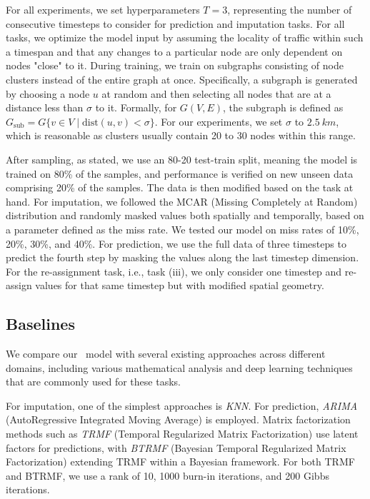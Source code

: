 For all experiments, we set hyperparameters \(T = 3\), representing the number of consecutive timesteps to consider for prediction and imputation tasks. For all tasks, we optimize the model input by assuming the locality of traffic within such a timespan and that any changes to a particular node are only dependent on nodes "close" to it. During training, we train on subgraphs consisting of node clusters instead of the entire graph at once. Specifically, a subgraph is generated by choosing a node \(u\) at random and then selecting all nodes that are at a distance less than \(\sigma\) to it. Formally, for \(G(V, E)\), the subgraph is defined as \(G_{\text{sub}} = G\{v \in V \mid \text{dist}(u, v) < \sigma\}\). For our experiments, we set \(\sigma\) to \(2.5\ km\), which is reasonable as clusters usually contain 20 to 30 nodes within this range.

After sampling, as stated, we use an 80-20 test-train split, meaning the model is trained on 80\% of the samples, and performance is verified on new unseen data comprising 20\% of the samples. The data is then modified based on the task at hand. For imputation, we followed the MCAR (Missing Completely at Random) distribution and randomly masked values both spatially and temporally, based on a parameter defined as the miss rate. We tested our model on miss rates of 10\%, 20\%, 30\%, and 40\%. For prediction, we use the full data of three timesteps to predict the fourth step by masking the values along the last timestep dimension. For the re-assignment task, i.e., task (iii), we only consider one timestep and re-assign values for that same timestep but with modified spatial geometry.

\subsection{Baselines}

We compare our \name\ model with several existing approaches across different domains, including various mathematical analysis and deep learning techniques that are commonly used for these tasks.

For imputation, one of the simplest approaches is \textit{KNN}. For prediction, \textit{ARIMA} (AutoRegressive Integrated Moving Average) \cite{arima} is employed. Matrix factorization methods such as \textit{TRMF} (Temporal Regularized Matrix Factorization) \cite{trmf} use latent factors for predictions, with \textit{BTRMF} (Bayesian Temporal Regularized Matrix Factorization) extending TRMF within a Bayesian framework. For both TRMF and BTRMF, we use a rank of 10, 1000 burn-in iterations, and 200 Gibbs iterations.

